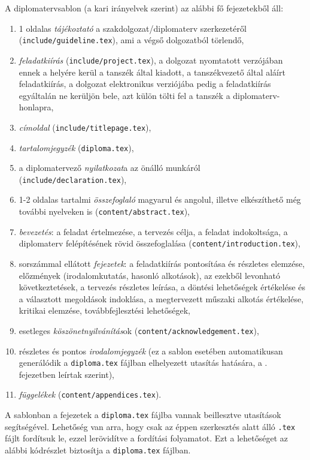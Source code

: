 A diplomatervsablon (a kari irányelvek szerint) az alábbi fő fejezetekből áll:
\begin{enumerate}
	\item 1 oldalas \emph{tájékoztató} a szakdolgozat/diplomaterv szerkezetéről (\verb+include/guideline.tex+), ami a végső dolgozatból törlendő,
	\item \emph{feladatkiírás} (\verb+include/project.tex+), a dolgozat nyomtatott verzójában ennek a helyére kerül a tanszék által kiadott, a tanszékvezető által aláírt feladatkiírás, a dolgozat elektronikus verziójába pedig a feladatkiírás egyáltalán ne kerüljön bele, azt külön tölti fel a tanszék a diplomaterv-honlapra,
	\item \emph{címoldal} (\verb+include/titlepage.tex+),
	\item \emph{tartalomjegyzék} (\verb+diploma.tex+),
	\item a diplomatervező \emph{nyilatkozat}a az önálló munkáról (\verb+include/declaration.tex+),
	\item 1-2 oldalas tartalmi \emph{összefoglaló} magyarul és angolul, illetve elkészíthető még további nyelveken is (\verb+content/abstract.tex+),
	\item \emph{bevezetés}: a feladat értelmezése, a tervezés célja, a feladat indokoltsága, a diplomaterv felépítésének rövid összefoglalása (\verb+content/introduction.tex+),
	\item sorszámmal ellátott \emph{fejezetek}: a feladatkiírás pontosítása és részletes elemzése, előzmények (irodalomkutatás, hasonló alkotások), az ezekből levonható következtetések, a tervezés részletes leírása, a döntési lehetőségek értékelése és a választott megoldások indoklása, a megtervezett műszaki alkotás értékelése, kritikai elemzése, továbbfejlesztési lehetőségek,
	\item esetleges \emph{köszönetnyilvánítás}ok (\verb+content/acknowledgement.tex+),
	\item részletes és pontos \emph{irodalomjegyzék} (ez a sablon esetében automatikusan generálódik a \verb+diploma.tex+ fájlban elhelyezett \verb++ utasítás hatására, a . fejezetben leírtak szerint),
	\item \emph{függelékek} (\verb+content/appendices.tex+).
\end{enumerate}

A sablonban a fejezetek a \verb+diploma.tex+ fájlba vannak beillesztve \verb++ utasítások segítségével. Lehetőség van arra, hogy csak az éppen szerkesztés alatt álló \verb+.tex+ fájlt fordítsuk le, ezzel lerövidítve a fordítási folyamatot. Ezt a lehetőséget az alábbi kódrészlet biztosítja a \verb+diploma.tex+ fájlban.
\begin{lstlisting}

\end{lstlisting}

